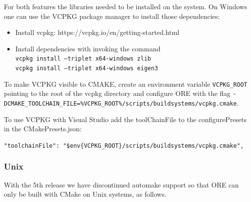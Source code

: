 \documentclass[12pt, a4paper]{article}
\begin{document}
For both features the libraries needed to be installed on the system. On Windows one can use the VCPKG package manager to install those dependencies:

\begin{itemize}
\item Install vcpkg: https://vcpkg.io/en/getting-started.html
\item Install dependencies with invoking the command \\
\medskip
{\tt vcpkg install --triplet x64-windows zlib} \\
{\tt vcpkg install --triplet x64-windows eigen3} \\
\medskip
\end{itemize}

To make VCPKG visible to CMAKE, create an environment variable {\tt VCPKG\_ROOT} pointing to the root of the vcpkg directory and configure ORE with the flag {\tt -DCMAKE\_TOOLCHAIN\_FILE=\%VCPKG\_ROOT\%/scripts/buildsystems/vcpkg.cmake}. 

To use VCPKG with Visual Studio add the toolChainFile to the configurePresets in the CMakePresets.json:

{\tt "toolchainFile": "\$env\{VCPKG\_ROOT\}/scripts/buildsystems/vcpkg.cmake",}

\subsubsection*{Unix}

With the 5th release we have discontinued automake support so that ORE can only be built with CMake on Unix systems, as follows.
\end{document}
